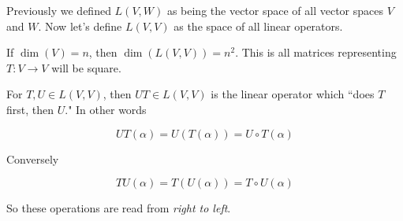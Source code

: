 \documentclass[12pt]{article}
\begin{document}
  Previously we defined $L(V, W)$ as being the vector space of all vector spaces
  $V$ and $W$. Now let's define $L(V, V)$ as the space of all linear operators.

  If $\dim(V) = n$, then $\dim(L(V, V)) = n^2$. This is all matrices
  representing $T: V \to V$ will be square.

  For $T, U \in L(V, V)$, then $UT \in L(V, V)$ is the linear operator which
  ``does $T$ first, then $U$." In other words

  \[
    UT(\alpha) = U(T(\alpha)) = U \circ T (\alpha)
  \]

  Conversely

  \[
    TU(\alpha) = T(U(\alpha)) = T \circ U (\alpha)
  \]

  So these operations are read from {\it right to left}.


\end{document}
